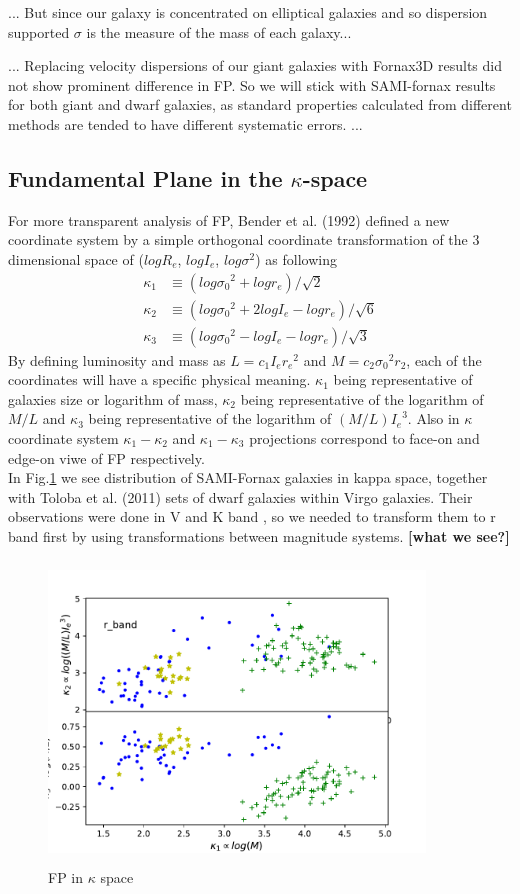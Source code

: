 \documentclass{aa}
\begin{document}
... But since our galaxy is concentrated on elliptical galaxies and so dispersion supported $\sigma$ is the measure of the mass of each galaxy...

... Replacing velocity dispersions of our giant galaxies with Fornax3D results did not show prominent difference in FP. So we will stick with SAMI-fornax results for both giant and dwarf galaxies, as standard properties calculated from different methods are tended to have different systematic errors. ... 

\subsection{Fundamental Plane in the $\kappa$-space}
For more transparent analysis of FP, Bender et al. (1992) defined a new coordinate system by a simple orthogonal coordinate transformation of the 3 dimensional space of ($logR_e$, $logI_e$, $log\sigma^2$) as following
\begin{align}
\kappa_1 &\equiv(log{\sigma_0}^2+log r_e)/\sqrt{2} \\
\kappa_2 &\equiv(log{\sigma_0}^2+2logI_e-log r_e)/\sqrt{6} \\
\kappa_3 &\equiv(log{\sigma_0}^2-log I_e-log r_e)/\sqrt{3}
\end{align}
By defining luminosity and mass as $L=c_1I_e{r_e}^2$ and $M=c_2{\sigma_0}^2r_2$, each of the coordinates will have a specific physical meaning. $\kappa_1$ being representative of galaxies size or logarithm of mass, $\kappa_2$ being representative of the logarithm of $M/L$ and $\kappa_3$ being representative of the logarithm of $(M/L){I_e}^3$. Also in $\kappa$ coordinate system $\kappa_1-\kappa_2$ and $\kappa_1-\kappa_3$ projections correspond to face-on and edge-on viwe of FP respectively.\\
In Fig.\ref{fig:FPkappa} we see distribution of SAMI-Fornax galaxies in kappa space, together with Toloba et al. (2011) sets of dwarf galaxies within Virgo galaxies. Their observations were done in V and K band , so we needed to transform them to r band first by using transformations between magnitude systems. \textbf{[what we see?]}
\begin{figure}[!htb]
   \centering
   \includegraphics[width=10cm,height=8cm,keepaspectratio]
   {../2_pipeline/3_FP_kappa+Liter/FP_kappa+Liter_EXC.pdf}
         \caption{FP in $\kappa$ space}
         \label{fig:FPkappa}
\end{figure}
\end{document}
